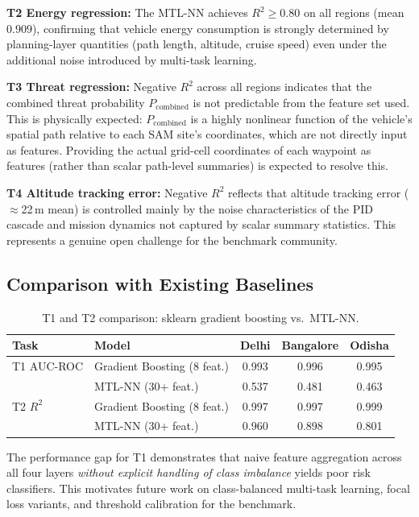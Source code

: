 ﻿\documentclass{article}
\begin{document}
\textbf{T2 Energy regression:} The MTL-NN achieves $R^2 \geq 0.80$ on all
regions (mean $0.909$), confirming that vehicle energy consumption is strongly
determined by planning-layer quantities (path length, altitude, cruise speed)
even under the additional noise introduced by multi-task learning.

\textbf{T3 Threat regression:} Negative $R^2$ across all regions indicates
that the combined threat probability $P_\text{combined}$ is not predictable
from the feature set used. This is physically expected: $P_\text{combined}$
is a highly nonlinear function of the vehicle's spatial path relative to
each SAM site's coordinates, which are not directly input as features.
Providing the actual grid-cell coordinates of each waypoint as features
(rather than scalar path-level summaries) is expected to resolve this.

\textbf{T4 Altitude tracking error:} Negative $R^2$ reflects that altitude
tracking error ($\approx$22\,m mean) is controlled mainly by the noise
characteristics of the PID cascade and mission dynamics not captured by
scalar summary statistics. This represents a genuine open challenge for
the benchmark community.

\subsection{Comparison with Existing Baselines}
\label{sec:comparison}

\begin{table}[h]
\centering
\caption{T1 and T2 comparison: sklearn gradient boosting vs.\ MTL-NN.}
\label{tab:comparison}
\begin{tabular}{llccc}
\toprule
Task & Model & Delhi & Bangalore & Odisha \\
\midrule
T1 AUC-ROC & Gradient Boosting (8 feat.) & 0.993 & 0.996 & 0.995 \\
           & MTL-NN (30+ feat.) & 0.537 & 0.481 & 0.463 \\
\midrule
T2 $R^2$   & Gradient Boosting (8 feat.) & 0.997 & 0.997 & 0.999 \\
           & MTL-NN (30+ feat.)          & 0.960 & 0.898 & 0.801 \\
\bottomrule
\end{tabular}
\end{table}

The performance gap for T1 demonstrates that naive feature aggregation
across all four layers \emph{without explicit handling of class imbalance}
yields poor risk classifiers. This motivates future work on class-balanced
multi-task learning, focal loss variants, and threshold calibration for
the benchmark.
\end{document}

